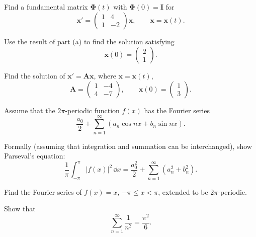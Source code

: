 \documentclass[11pt,oneside]{article}
\begin{document}
\begin{problem}
\begin{problemsubparts}
\item Find a fundamental matrix $\boldsymbol\Phi(t)$ with $\boldsymbol\Phi(0)=\mathbf I$ for
\[
\mathbf x'=\begin{pmatrix}1&4\\1&-2\end{pmatrix}\mathbf x,
\qquad\mathbf x=\mathbf x(t).
\]
\item Use the result of part (a) to find the solution satisfying
\[
\mathbf x(0)=\begin{pmatrix}2\\1\end{pmatrix}.
\]
\end{problemsubparts}
\end{problem}

\begin{problem}
Find the solution of $\mathbf x'=\mathbf A\mathbf x$, where $\mathbf x=\mathbf x(t)$,
\[
\mathbf A=\begin{pmatrix}1&-4\\4&-7\end{pmatrix},\qquad
\mathbf x(0)=\begin{pmatrix}1\\3\end{pmatrix}.
\]
\end{problem}

\begin{problem}
Assume that the $2\pi$-periodic function $f(x)$ has the Fourier series
\[
\frac{a_0}{2}+\sum_{n=1}^{\infty}(a_n\cos nx+b_n\sin nx).
\]
\begin{problemsubparts}
\item Formally (assuming that integration and summation can be interchanged), show Parseval's equation:
\[
\frac1\pi\int_{-\pi}^{\pi}|f(x)|^2\,\dd x
=\frac{a_0^2}{2}+\sum_{n=1}^{\infty}(a_n^2+b_n^2).
\]
\item Find the Fourier series of $f(x)=x$, $-\pi\le x<\pi$, extended to be $2\pi$-periodic.
\item Show that
\[
\sum_{n=1}^{\infty}\frac1{n^2}=\frac{\pi^2}{6}.
\]
\end{problemsubparts}
\end{problem}
\end{document}
